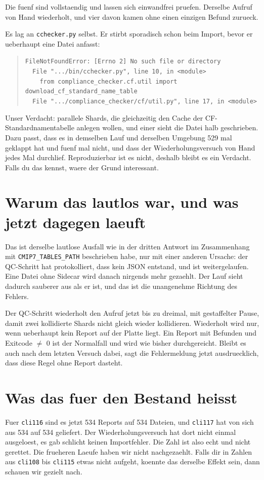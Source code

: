\documentclass[11pt,a4paper]{article}
\newcommand{\code}[1]{\texttt{\small #1}}
\begin{document}
Die fuenf sind vollstaendig und lassen sich einwandfrei
pruefen. Derselbe Aufruf von Hand wiederholt, und vier davon
kamen ohne einen einzigen Befund zurueck.

Es lag an \code{cchecker.py} selbst. Er stirbt sporadisch schon beim Import, bevor er
ueberhaupt eine Datei anfasst:

\begin{quote}
\code{FileNotFoundError: [Errno 2] No such file or directory}\\
\code{~~File ".../bin/cchecker.py", line 10, in <module>}\\
\code{~~~~from compliance\_checker.cf.util import download\_cf\_standard\_name\_table}\\
\code{~~File ".../compliance\_checker/cf/util.py", line 17, in <module>}
\end{quote}

Unser Verdacht: parallele Shards, die gleichzeitig den Cache der
CF-Standardnamentabelle anlegen wollen, und einer sieht die Datei halb geschrieben.
Dazu passt, dass es in demselben Lauf und derselben Umgebung 529 mal geklappt hat
und fuenf mal nicht, und dass der Wiederholungsversuch von Hand jedes Mal
durchlief. Reproduzierbar ist es nicht, deshalb bleibt es ein Verdacht.
Falls du das kennst, waere der Grund interessant.

\section{Warum das lautlos war, und was jetzt dagegen laeuft}

Das ist derselbe lautlose Ausfall wie in der dritten Antwort im Zusammenhang mit
\code{CMIP7\_TABLES\_PATH} beschrieben habe, nur mit einer anderen Ursache: der
QC-Schritt hat protokolliert, dass kein JSON entstand, und ist weitergelaufen. Eine
Datei ohne Sidecar wird danach nirgends mehr gezaehlt. Der Lauf sieht dadurch
sauberer aus als er ist, und das ist die unangenehme Richtung des Fehlers.

Der QC-Schritt wiederholt den Aufruf jetzt bis zu dreimal, mit gestaffelter Pause,
damit zwei kollidierte Shards nicht gleich wieder kollidieren. Wiederholt wird nur,
wenn ueberhaupt kein Report auf der Platte liegt. Ein Report mit Befunden und
Exitcode $\neq$ 0 ist der Normalfall und wird wie bisher durchgereicht. Bleibt es
auch nach dem letzten Versuch dabei, sagt die Fehlermeldung jetzt ausdruecklich,
dass diese Regel ohne Report dasteht.

\section{Was das fuer den Bestand heisst}

Fuer \code{cli116} sind es jetzt 534 Reports auf 534 Dateien, und \code{cli117}
hat von sich aus 534 auf 534 geliefert. Der Wiederholungsversuch hat dort nicht
einmal ausgeloest, es gab schlicht keinen Importfehler. Die Zahl ist also echt und
nicht gerettet. Die frueheren Laeufe haben wir nicht nachgezaehlt. Falls dir in Zahlen aus
\code{cli108} bis \code{cli115} etwas nicht aufgeht, koennte das derselbe Effekt
sein, dann schauen wir gezielt nach.
\end{document}
